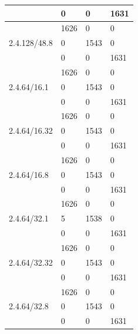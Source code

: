 \documentclass[12pt]{article}
\begin{document}
\begin{longtable}{llll}
                                                                            &  0 & 0 & 1631 \\ \hline
\multirow{3}{*}{2.4.128/48.8}   &  1626 & 0 & 0 \\
                                                                            &  0 & 1543 & 0 \\
                                                                            &  0 & 0 & 1631 \\ \hline
\multirow{3}{*}{2.4.64/16.1}   &  1626 & 0 & 0 \\
                                                                            &  0 & 1543 & 0 \\
                                                                            &  0 & 0 & 1631 \\ \hline
\multirow{3}{*}{2.4.64/16.32}   &  1626 & 0 & 0 \\
                                                                            &  0 & 1543 & 0 \\
                                                                            &  0 & 0 & 1631 \\ \hline
\multirow{3}{*}{2.4.64/16.8}   &  1626 & 0 & 0 \\
                                                                            &  0 & 1543 & 0 \\
                                                                            &  0 & 0 & 1631 \\ \hline
\multirow{3}{*}{2.4.64/32.1}   &  1626 & 0 & 0 \\
                                                                            &  5 & 1538 & 0 \\
                                                                            &  0 & 0 & 1631 \\ \hline
\multirow{3}{*}{2.4.64/32.32}   &  1626 & 0 & 0 \\
                                                                            &  0 & 1543 & 0 \\
                                                                            &  0 & 0 & 1631 \\ \hline
\multirow{3}{*}{2.4.64/32.8}   &  1626 & 0 & 0 \\
                                                                            &  0 & 1543 & 0 \\
                                                                            &  0 & 0 & 1631 \\ \hline

\end{longtable}
\end{document}
